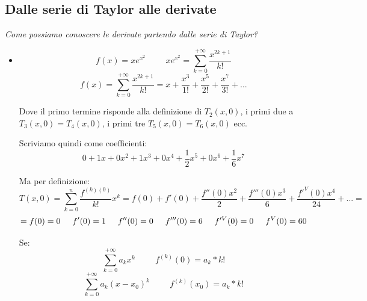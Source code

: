 \subsection*{Dalle serie di Taylor alle derivate}
\textit{Come possiamo conoscere le derivate partendo dalle serie di Taylor?}
\begin{example}
    \begin{itemize}
        \item \begin{equation*}f(x)=xe^{x^2}\hspace{1cm}xe^{x^2}=\sum^{+\infty}_{k=0}\frac{x^{2k+1}}{k!}\end{equation*} 
        \begin{equation*}
            f(x)=\sum^{+\infty}_{k=0}\frac{x^{2k+1}}{k!}=x+\frac{x^3}{1!}+\frac{x^5}{2!}+\frac{x^7}{3!}+...
        \end{equation*}
        
        Dove il primo termine risponde alla definizione di $T_2(x,0)$, i primi due a $T_3(x,0)=T_4(x,0)$, i primi tre $T_5(x,0)=T_6(x,0)$ ecc.
        
        Scriviamo quindi come coefficienti:
        \begin{equation*}
            0+1x+0x^2+1x^3+0x^4+\frac{1}{2} x^5+0x^6+\frac{1}{6}x^7
        \end{equation*}
        
        Ma per definizione:
        \begin{equation*}
            T(x,0)=\sum^n_{k=0}\frac{f^{(k)(0)}}{k!}x^k=f(0)+f'(0)+\frac{f''(0)x^2}{2}+\frac{f'''(0)x^3}{6}+\frac{f'^V(0)x^4}{24}+...=
        \end{equation*}
        \begin{equation*}
            =f(0)=0\hspace{0.5cm}f'(0)=1\hspace{0.5cm}f''(0)=0\hspace{0.5cm}f'''(0)=6\hspace{0.5cm}f'^V(0)=0\hspace{0.5cm}f^V(0)=60
        \end{equation*}
        
        \begin{osservation*}
            Se:
            \begin{equation*}
                \sum^{+\infty}_{k=0}a_kx^k\hspace{1cm}f^{(k)}(0)=a_k*k!
            \end{equation*}
            \begin{equation*}
                \sum^{+\infty}_{k=0}a_k(x-x_0)^k\hspace{1cm}f^{(k)}(x_0)=a_k*k!
            \end{equation*}
        

\end{osservation*}
\end{itemize}
\end{example}
